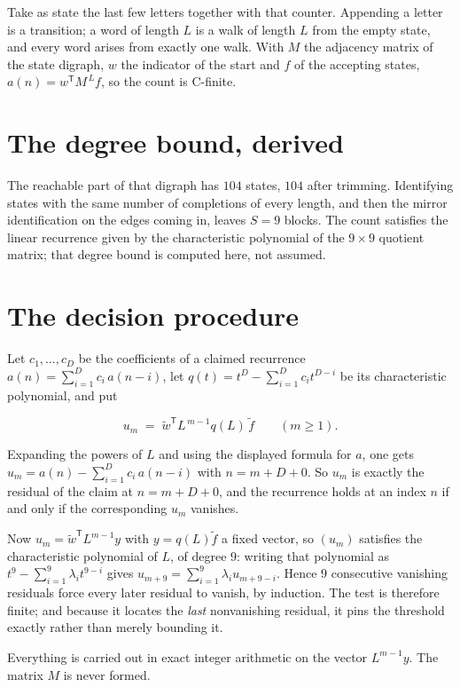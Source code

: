\documentclass[11pt]{article}
\theoremstyle{definition}
\begin{document}
Take as state the last few letters together with that counter. Appending a letter is a transition; a word of length $L$ is a walk of length $L$ from the empty state, and every word arises from exactly one walk. With $M$ the adjacency matrix of the state digraph, $w$ the indicator of the start and $f$ of the accepting states, $a(n) = w^{\mathsf T}M^{\,L}f$, so the count is C-finite.

\section{The degree bound, derived}

The reachable part of that digraph has $104$ states, $104$ after trimming. Identifying states with the same number of completions of every length, and then the mirror identification on the edges coming in, leaves $S = 9$ blocks. The count satisfies the linear recurrence given by the characteristic polynomial of the $9\times9$ quotient matrix; that degree bound is computed here, not assumed.

\section{The decision procedure}

Let $c_1,\dots,c_D$ be the coefficients of a claimed recurrence $a(n) = \sum_{i=1}^{D} c_i\,a(n-i)$, let $q(t) = t^{D} - \sum_{i=1}^{D} c_i t^{D-i}$ be its characteristic polynomial, and put

\[u_m \;=\; \tilde w^{\mathsf T} L^{\,m-1} q(L)\,\tilde f \qquad (m \ge 1).\]

Expanding the powers of $L$ and using the displayed formula for $a$, one gets $u_m = a(n) - \sum_{i=1}^{D} c_i\,a(n-i)$ with $n = m + D + 0$. So $u_m$ is exactly the residual of the claim at $n = m + D + 0$, and the recurrence holds at an index $n$ if and only if the corresponding $u_m$ vanishes.

Now $u_m = \tilde w^{\mathsf T} L^{m-1} y$ with $y = q(L)\tilde f$ a fixed vector, so $(u_m)$ satisfies the characteristic polynomial of $L$, of degree $9$: writing that polynomial as $t^{9} - \sum_{i=1}^{9} \lambda_i t^{9-i}$ gives $u_{m+9} = \sum_{i=1}^{9} \lambda_i u_{m+9-i}$. Hence $9$ consecutive vanishing residuals force every later residual to vanish, by induction. The test is therefore finite; and because it locates the {\itshape last} nonvanishing residual, it pins the threshold exactly rather than merely bounding it.

Everything is carried out in exact integer arithmetic on the vector $L^{m-1}y$. The matrix $M$ is never formed.
\end{document}
